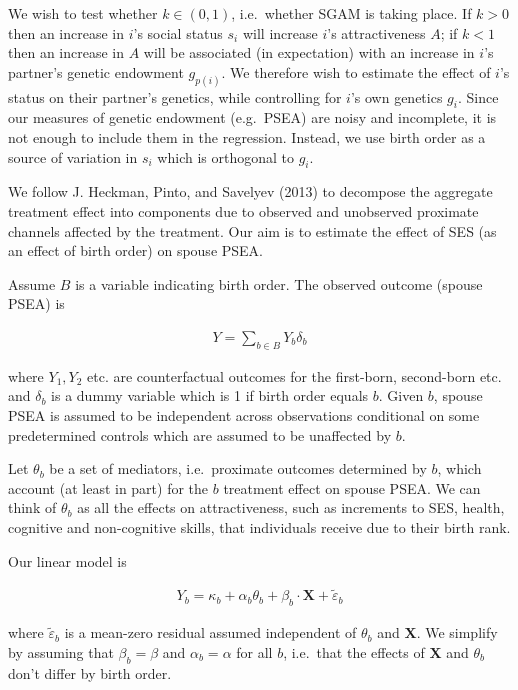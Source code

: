 \documentclass[
]{article}
\begin{document}
We wish to test whether \(k \in (0, 1)\), i.e.~whether SGAM is taking
place. If \(k > 0\) then an increase in \(i\)'s social status \(s_i\) will
increase \(i\)'s attractiveness \(A\); if \(k < 1\) then an increase in \(A\)
will be associated (in expectation) with an increase in \(i\)'s partner's
genetic endowment \(g_{p(i)}\). We therefore wish to estimate the effect
of \(i\)'s status on their partner's genetics, while controlling for \(i\)'s
own genetics \(g_i\). Since our measures of genetic endowment (e.g.~PSEA)
are noisy and incomplete, it is not enough to include them in the
regression. Instead, we use birth order as a source of variation in
\(s_i\) which is orthogonal to \(g_i\).

We follow J. Heckman, Pinto, and Savelyev (2013) to decompose the aggregate treatment
effect into components due to observed and unobserved proximate channels
affected by the treatment. Our aim is to estimate the effect of SES (as
an effect of birth order) on spouse PSEA.

Assume \(B\) is a variable indicating birth order. The observed outcome
(spouse PSEA) is

\begin{align}
\label{eq:Y}
Y = \sum_{b \in B}Y_b\delta_b
\end{align}

where \(Y_1, Y_2\) etc. are counterfactual outcomes for the first-born,
second-born etc. and \(\delta_b\) is a dummy variable which is 1 if birth
order equals \(b\). Given \(b\), spouse PSEA is assumed to be independent
across observations conditional on some predetermined controls which are
assumed to be unaffected by \(b\).

Let \(\theta_b\) be a set of mediators, i.e.~proximate outcomes determined
by \(b\), which account (at least in part) for the \(b\) treatment effect on
spouse PSEA. We can think of \(\theta_b\) as all the effects on
attractiveness, such as increments to SES, health, cognitive and
non-cognitive skills, that individuals receive due to their birth rank.

Our linear model is

\begin{align}
\label{eq:Yb}
Y_b = \kappa_b + \alpha_b\theta_b + \beta_b \cdot \mathbf{X} + \tilde{\varepsilon}_b
\end{align}

where \(\tilde{\varepsilon}_b\) is a mean-zero residual assumed
independent of \(\theta_b\) and \(\mathbf{X}\). We simplify by assuming that
\(\beta_b = \beta\) and \(\alpha_b = \alpha\) for all \(b\), i.e.~that the
effects of \(\mathbf{X}\) and \(\theta_b\) don't differ by birth order.
\end{document}
